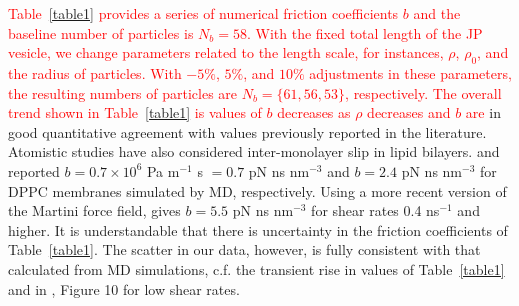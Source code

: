 \documentclass[lineno]{jfm}
\newcommand{\ReviewerOne}[1]{\textcolor{red}{#1}}
\begin{document}
\ReviewerOne{Table~\ref{table1} provides a series of numerical friction coefficients $b$ and the baseline number of particles is $N_b = 58$. With the fixed total length of the JP vesicle, we change parameters related to the length scale, for instances, $\rho$, $\rho_0$, and the radius of particles.
With $-5\%$, $5\%$, and $10\%$ adjustments in these parameters, the resulting numbers of particles are $N_b=\{61,56,53\}$, respectively. }
%
\ReviewerOne{The overall trend shown in Table~\ref{table1} is values of $b$ decreases as $\rho$
decreases and $b$ are}
in good quantitative agreement with values previously reported in the literature.
Atomistic studies have also considered inter-monolayer slip in lipid bilayers. 
\cite{WuoEd06} and \cite{denOtter2007} reported $b = 0.7 \times 10^6$ Pa m$^{-1}$ s  
$=0.7$ pN ns nm$^{-3}$  
and $b = 2.4$  pN ns nm$^{-3}$ for DPPC membranes simulated by MD, respectively. 
Using a more recent version of the Martini force field, \cite{Zgorski2019} 
gives $b = 5.5$ pN ns nm$^{-3}$ for shear rates 0.4 ns$^{-1}$ and higher.
It is understandable that there is uncertainty in the friction coefficients of
Table~\ref{table1}.  The scatter in our data, however, is fully consistent with that calculated
from MD simulations, c.f. the transient rise in values of Table~\ref{table1} and in \cite{Zgorski2019}, Figure 10
for low shear rates. 
\end{document}
